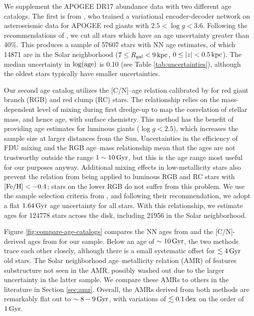 \documentclass[twocolumn,twocolappendix]{aastex701}
\newcommand{\mathFeH}{{\rm [Fe/H]}}
\newcommand{\kpc}{\,{\rm kpc}}
\newcommand{\Gyr}{\,{\rm Gyr}}
\newcommand{\dex}{\,{\rm dex}}
\begin{document}
We supplement the APOGEE DR17 abundance data with two different age catalogs. The first is from \citet{leung_variational_2023}, who trained a variational encoder-decoder network on asteroseismic data for APOGEE red giants with $2.5<\log g<3.6$. Following the recommendations of \citet{leung_variational_2023}, we cut all stars which have an age uncertainty greater than 40\%. This produces a sample of \num{57607} stars with NN age estimates, of which \num{14871} are in the Solar neighborhood ($7\leq R_{\rm gal}<9\kpc$, $0\leq|z|<0.5\kpc$). The median uncertainty in $\log({\rm age})$ is 0.10 (see Table \ref{tab:uncertainties}), although the oldest stars typically have smaller uncertainties.

Our second age catalog utilizes the [C/N]--age relation calibrated by \citet{roberts_cn_2025} for red giant branch (RGB) and red clump (RC) stars. The relationship relies on the mass-dependent level of mixing during first dredge-up \citep[FDU;][]{iben_stellar_1967} to map the correlation of stellar mass, and hence age, with surface chemistry. This method has the benefit of providing age estimates for luminous giants ($\log g<2.5$), which increases the sample size at larger distances from the Sun. Uncertainties in the efficiency of FDU mixing and the RGB age--mass relationship mean that the ages are not trustworthy outside the range $1\sim10\Gyr$, but this is the age range most useful for our purposes anyway. Additional mixing effects in low-metallicity stars also prevent the relation from being applied to luminous RGB and RC stars with $\mathFeH<-0.4$; stars on the lower RGB do not suffer from this problem. 
We use the sample selection criteria from \citet{roberts_cn_2025}, and following their recommendation, we adopt a flat $1.64\Gyr$ age uncertainty for all stars.
With this relationship, we estimate ages for \num{124778} stars across the disk, including \num{21956} in the Solar neighborhood.

Figure \ref{fig:compare-age-catalogs} compares the NN ages from \citet{leung_variational_2023} and the [C/N]-derived ages from \citet{roberts_cn_2025} for our sample. Below an age of $\sim10\Gyr$, the two methods trace each other closely, although there is a small systematic offset for $\lesssim4\Gyr$ old stars. The Solar neighborhood age--metallicity relation (AMR) of \citet{leung_variational_2023} features substructure not seen in the \citet{roberts_cn_2025} AMR, possibly washed out due to the larger uncertainty in the latter sample. We compare these AMRs to others in the literature in Section \ref{sec:amr}. Overall, the AMRs derived from both methods are remarkably flat out to $\sim8-9\Gyr$, with variations of $\lesssim0.1\dex$ on the order of $1\Gyr$.
\end{document}
